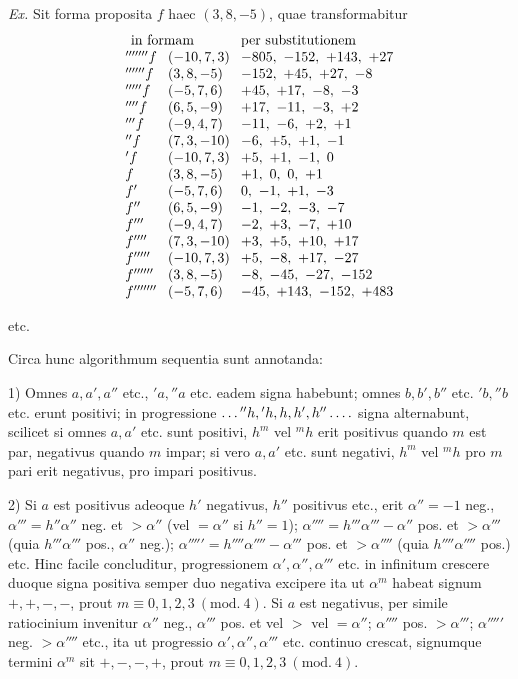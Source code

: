 \textit{Ex.} Sit forma proposita $f$ haec $(3,8,-5)$, quae transformabitur
\[
\setlength{\arraycolsep}{4pt}
\begin{array}{@{}lll@{}}
\multicolumn{2}{l}{\text{in formam}}&\text{per substitutionem}\\
{}'''''''f&(-10,7,3)&-805,\ -152,\ +143,\ +27\\
{}''''''f&(3,8,-5)&-152,\ +45,\ +27,\ -8\\
{}'''''f&(-5,7,6)&+45,\ +17,\ -8,\ -3\\
{}''''f&(6,5,-9)&+17,\ -11,\ -3,\ +2\\
{}'''f&(-9,4,7)&-11,\ -6,\ +2,\ +1\\
{}''f&(7,3,-10)&-6,\ +5,\ +1,\ -1\\
{}'f&(-10,7,3)&+5,\ +1,\ -1,\ 0\\
f&(3,8,-5)&+1,\ 0,\ 0,\ +1\\
f'&(-5,7,6)&0,\ -1,\ +1,\ -3\\
f''&(6,5,-9)&-1,\ -2,\ -3,\ -7\\
f'''&(-9,4,7)&-2,\ +3,\ -7,\ +10\\
f''''&(7,3,-10)&+3,\ +5,\ +10,\ +17\\
f'''''&(-10,7,3)&+5,\ -8,\ +17,\ -27\\
f''''''&(3,8,-5)&-8,\ -45,\ -27,\ -152\\
f'''''''&(-5,7,6)&-45,\ +143,\ -152,\ +483
\end{array}
\]
\centerline{etc.}


Circa hunc algorithmum sequentia sunt annotanda:

1) Omnes $a,a',a''$ etc., ${}'a,{}''a$ etc. eadem signa habebunt; omnes $b,b',b''$ etc. ${}'b,{}''b$ etc. erunt positivi; in progressione $\mathinner{\ldotp\ldotp\ldotp} {}''h,{}'h,h,h',h''\mathinner{\ldotp\ldotp\ldotp\ldotp}$ signa alternabunt, scilicet si omnes $a,a'$ etc. sunt positivi, $h^m$ vel ${}^m h$ erit positivus quando $m$ est par, negativus quando $m$ impar; si vero $a,a'$ etc. sunt negativi, $h^m$ vel ${}^m h$ pro $m$ pari erit negativus, pro impari positivus.

2) Si $a$ est positivus adeoque $h'$ negativus, $h''$ positivus etc., erit $\alpha''=-1$ neg., $\alpha'''=h''\alpha''$ neg. et $>\alpha''$ (vel $=\alpha''$ si $h''=1$); $\alpha''''=h'''\alpha'''-\alpha''$ pos. et $>\alpha'''$ (quia $h'''\alpha'''$ pos., $\alpha''$ neg.); $\alpha'''''=h''''\alpha''''-\alpha'''$ pos. et $>\alpha''''$ (quia $h''''\alpha''''$ pos.) etc. Hinc facile concluditur, progressionem $\alpha',\alpha'',\alpha'''$ etc. in infinitum crescere duoque signa positiva semper duo negativa excipere ita ut $\alpha^m$ habeat signum $+,+,-,-$, prout $m\equiv0,1,2,3\ (\mathrm{mod.}\ 4)$. Si $a$ est negativus, per simile ratiocinium invenitur $\alpha''$ neg., $\alpha'''$ pos. et vel $>$ vel $=\alpha''$; $\alpha''''$ pos. $>\alpha'''$; $\alpha'''''$ neg. $>\alpha''''$ etc.,
ita ut progressio $\alpha',\alpha'',\alpha'''$ etc. continuo crescat, signumque termini $\alpha^m$ sit $+,-,-,+$, prout $m\equiv0,1,2,3\ (\mathrm{mod.}\ 4)$.

